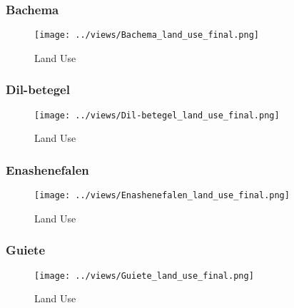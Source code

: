 \documentclass[10pt,a4paper,onecolumn]{article}
\begin{document}
\subsubsection{Bachema}



\begin{figure}[H] \centering
  \captionsetup{justification=centering}
\caption{Land Use} 
\centering


\texttt{[image: ../views/Bachema\_land\_use\_final.png]}

\end{figure}


\pagebreak


\subsubsection{Dil-betegel}


\begin{figure}[H] \centering
  \captionsetup{justification=centering}
\caption{Land Use} 
\centering


\texttt{[image: ../views/Dil-betegel\_land\_use\_final.png]}

\end{figure}




\subsubsection{Enashenefalen}


\begin{figure}[H] \centering
  \captionsetup{justification=centering}
\caption{Land Use} 
\centering


\texttt{[image: ../views/Enashenefalen\_land\_use\_final.png]}

\end{figure}



\pagebreak


\subsubsection{Guiete}


\begin{figure}[H] \centering
  \captionsetup{justification=centering}
\caption{Land Use} 
\centering


\texttt{[image: ../views/Guiete\_land\_use\_final.png]}

\end{figure}
\end{document}
